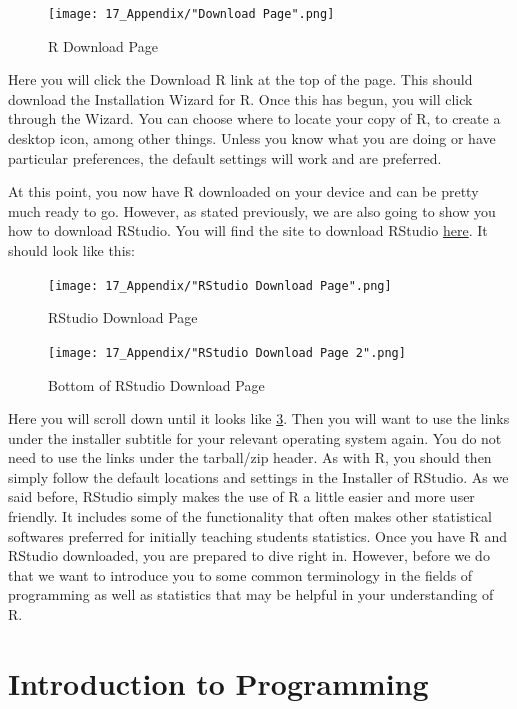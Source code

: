 \documentclass[11pt,openany]{book}\usepackage[]{graphicx}\usepackage[]{color}
\begin{document}
\begin{figure}[h]
\centering
\texttt{[image: 17\_Appendix/"Download Page".png]}
\caption{R Download Page
\label{fig:rdp}}
\end{figure}

Here you will click the Download R link at the top of the page. This should download the Installation Wizard for R. Once this has begun, you will click through the Wizard. You can choose where to locate your copy of R, to create a desktop icon, among other things. Unless you know what you are doing or have particular preferences, the default settings will work and are preferred. 

At this point, you now have R downloaded on your device and can be pretty much ready to go. However, as stated previously, we are also going to show you how to download RStudio. You will find the site to download RStudio \href{https://www.rstudio.com/products/rstudio/download2/}{here}. It should look like this: 

\begin{figure}[h]
\centering
\texttt{[image: 17\_Appendix/"RStudio Download Page".png]}
\caption{RStudio Download Page 
\label{fig:rsdp}}
\end{figure}

\begin{figure}[h]
\centering
\texttt{[image: 17\_Appendix/"RStudio Download Page 2".png]}
\caption{Bottom of RStudio Download Page 
\label{fig:brsdp}}
\end{figure}


Here you will scroll down until it looks like \ref{fig:brsdp}. Then you will want to use the links under the installer subtitle for your relevant operating system again. You do not need to use the links under the tarball/zip header. As with R, you should then simply follow the default locations and settings in the Installer of RStudio. As we said before, RStudio simply makes the use of R a little easier and more user friendly. It includes some of the functionality that often makes other statistical softwares preferred for initially teaching students statistics. Once you have R and RStudio downloaded, you are prepared to dive right in. However, before we do that we want to introduce you to some common terminology in the fields of programming as well as statistics that may be helpful in your understanding of R.

\section{Introduction to Programming}
\end{document}
